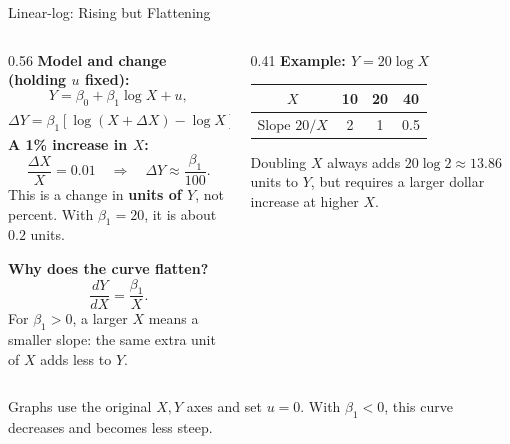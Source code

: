 \documentclass[notes,10pt, aspectratio=169]{beamer}
\begin{document}
\begin{frame}{Linear-log: Rising but Flattening}
\small
\setlength{\abovedisplayskip}{4pt}
\setlength{\belowdisplayskip}{4pt}
\setlength{\abovedisplayshortskip}{2pt}
\setlength{\belowdisplayshortskip}{2pt}
\begin{columns}[T]
\begin{column}{0.56\textwidth}
\textbf{Model and change (holding $u$ fixed):}
\[
Y=\beta_0+\beta_1\log X+u,
\]
\[
\Delta Y=\beta_1[\log(X+\Delta X)-\log X]
\approx\beta_1\frac{\Delta X}{X}.
\]
\textbf{A 1\% increase in $X$:}
\[
\frac{\Delta X}{X}=0.01
\quad\Rightarrow\quad
\Delta Y\approx\frac{\beta_1}{100}.
\]
This is a change in \textbf{units of $Y$}, not percent. With $\beta_1=20$, it is about $0.2$ units.
\vspace{3pt}

\textbf{Why does the curve flatten?}
\[
\boxed{\frac{dY}{dX}=\frac{\beta_1}{X}.}
\]
For $\beta_1>0$, a larger $X$ means a smaller slope: the same extra unit of $X$ adds less to $Y$.
\end{column}
\begin{column}{0.41\textwidth}
\centering
\textbf{Example: $Y=20\log X$}


\vspace{3pt}
\begin{tabular}{c|ccc}
$X$ & 10 & 20 & 40\\
\hline
Slope $20/X$ & 2 & 1 & 0.5
\end{tabular}
\vspace{3pt}

\raggedright
Doubling $X$ always adds $20\log 2\approx13.86$ units to $Y$, but requires a larger dollar increase at higher $X$.
\end{column}
\end{columns}
\vspace{3pt}
{\scriptsize Graphs use the original $X,Y$ axes and set $u=0$. With $\beta_1<0$, this curve decreases and becomes less steep.}
\end{frame}
\end{document}

